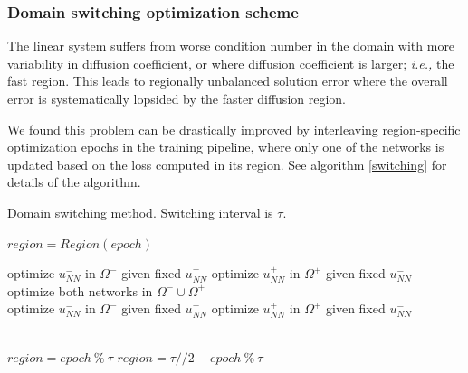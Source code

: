 \documentclass{elsarticle}
\begin{document}
\subsubsection{Domain switching optimization scheme}
The linear system suffers from worse condition number in the domain with more variability in diffusion coefficient, or where diffusion coefficient is larger; \textit{i.e.,} the fast region. This leads to regionally unbalanced solution error where the overall error is systematically lopsided by the faster diffusion region. 

We found this problem can be drastically improved by interleaving region-specific optimization epochs in the training pipeline, where only one of the networks is updated based on the loss computed in its region. See algorithm \ref{switching} for details of the algorithm.

\begin{algorithm}
	\caption{Domain switching method. Switching interval is $\tau$.}\label{switching}
	\begin{algorithmic}[1]
		
			\State $region = Region (epoch)$
			
				\If {$\mu^- > \mu^+$}
					\State optimize $u^-_{NN}$ in $\Omega^-$ given fixed $u^+_{NN}$  
				\Else
					\State optimize $u^+_{NN}$ in $\Omega^+$ given fixed $u^-_{NN}$ 
				\EndIf	
			\EndIf	
			\\
				\State optimize both networks in $\Omega^- \cup \Omega^+$ 
			\EndIf	
			\\
				\If {$\mu^- < \mu^+$}
					\State optimize $u^-_{NN}$ in $\Omega^-$ given fixed $u^+_{NN}$  
				\Else
					\State optimize $u^+_{NN}$ in $\Omega^+$ given fixed $u^-_{NN}$ 
				\EndIf					
			\EndIf	
				
			
		\EndFor

		\EndProcedure
		\\
				\State $region = epoch\ \%\ \tau $ 
			\EndIf
				\State $region = \tau // 2 - epoch\ \%\ \tau  $ 
			\EndIf
		\EndProcedure
	\end{algorithmic}
\end{algorithm}
\end{document}
